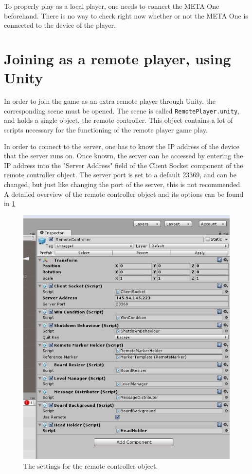 \documentclass{report}
\begin{document}
	To properly play as a local player, one needs to connect the META One beforehand.
	There is no way to check right now whether or not the META One is
	connected to the device of the player.

\section*{Joining as a remote player, using Unity}
	In order to join the game as an extra remote player through Unity, the corresponding
	scene must be opened. The scene is called \texttt{RemotePlayer.unity}, and holds a 
	single object, the remote controller. This object contains a lot of scripts necessary
	for the functioning of the remote player game play.
	
	In order to connect to the server, one has to know the IP address of the
	device that the server runs on. Once known, the server can be accessed by
	entering the IP address into the "Server Address" field of the Client Socket
	component of the remote controller object. The server port is set to a default
	23369, and can be changed, but just like changing the port of the server,
	this is not recommended. A detailed overview of the remote controller object
	and its options can be found in \ref{fig:remotecontroller}
	\begin{figure}[!ht]
	    \centering
	    \includegraphics[scale = 0.6]{RemoteController}
	    \caption{The settings for the remote controller object.}
	    \label{fig:remotecontroller}
	\end{figure}
\end{document}
